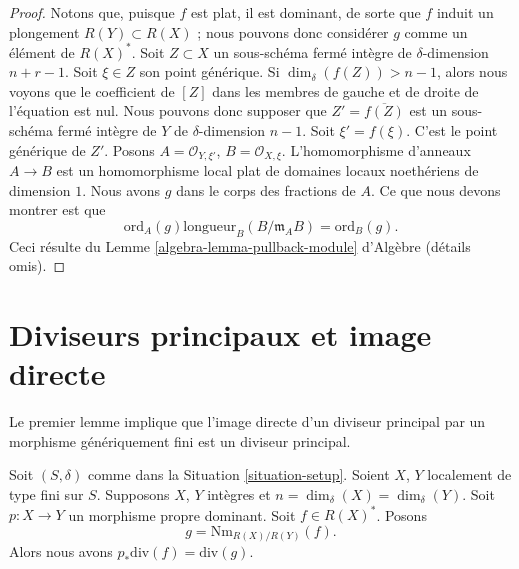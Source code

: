 \begin{proof}
Notons que, puisque $f$ est plat, il est dominant, de sorte que
$f$ induit un plongement $R(Y) \subset R(X)$ ; nous pouvons donc
considérer $g$ comme un élément de $R(X)^*$.
Soit $Z \subset X$ un sous-schéma fermé intègre de
$\delta$-dimension $n + r - 1$. Soit $\xi \in Z$
son point générique. Si $\dim_\delta(f(Z)) > n - 1$,
alors nous voyons que le coefficient de $[Z]$ dans les membres de gauche et
de droite de l'équation est nul.
Nous pouvons donc supposer que $Z' = \overline{f(Z)}$ est un
sous-schéma fermé intègre de $Y$ de $\delta$-dimension $n - 1$.
Soit $\xi' = f(\xi)$. C'est le point générique de $Z'$.
Posons $A = \mathcal{O}_{Y, \xi'}$, $B = \mathcal{O}_{X, \xi}$.
L'homomorphisme d'anneaux $A \to B$ est un homomorphisme local plat de
domaines locaux noethériens de dimension $1$.
Nous avons $g$ dans le corps des fractions de $A$. Ce que nous devons montrer est que
$$
\text{ord}_A(g) \text{longueur}_B(B/\mathfrak m_AB)
=
\text{ord}_B(g).
$$
Ceci résulte du Lemme \ref{algebra-lemma-pullback-module} d'Algèbre
(détails omis).
\end{proof}











\section{Diviseurs principaux et image directe}
\label{section-two-fun}

\noindent
Le premier lemme implique que l'image directe d'un diviseur
principal par un morphisme génériquement fini est un diviseur principal.

\begin{lemma}
\label{lemma-proper-pushforward-alteration}
Soit $(S, \delta)$ comme dans la Situation \ref{situation-setup}.
Soient $X$, $Y$ localement de type fini sur $S$. Supposons $X$, $Y$
intègres et $n = \dim_\delta(X) = \dim_\delta(Y)$.
Soit $p : X \to Y$ un morphisme propre dominant.
Soit $f \in R(X)^*$. Posons
$$
g = \text{Nm}_{R(X)/R(Y)}(f).
$$
Alors nous avons
$p_*\text{div}(f) = \text{div}(g)$.
\end{lemma}

